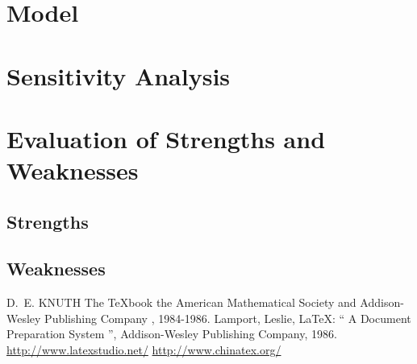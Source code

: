 \documentclass{mcmthesis}
\begin{document}
\section{Model}

\section{Sensitivity Analysis}

\section{Evaluation of Strengths and Weaknesses}

\subsection{Strengths}

\subsection{Weaknesses}

\begin{thebibliography}{99}
 D.~E. KNUTH   The \TeX{}book  the American
Mathematical Society and Addison-Wesley
Publishing Company , 1984-1986.
Lamport, Leslie,  \LaTeX{}: `` A Document Preparation System '',
Addison-Wesley Publishing Company, 1986.
\url{http://www.latexstudio.net/}
\url{http://www.chinatex.org/}
\end{thebibliography}
\end{document}
